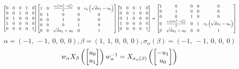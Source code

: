 \documentclass[11pt]{article}
\theoremstyle{definition}
\begin{document}
\[
\scaletoalign{\textwidth}{{\left[\begin{matrix}0 & 0 & 0 & 1 & 0\\0 & 0 & 1 & 0 & 0\\0 & 1 & 0 & 0 & 0\\1 & 0 & 0 & 0 & 0\\0 & 0 & 0 & 0 & 1\end{matrix}\right]} {\left[\begin{matrix}1 & 0 & \frac{c_{0} \left(d u_{1}^{2} - u_{0}^{2}\right)}{2} & 0 & c_{0} \left(\sqrt{d} u_{1} - u_{0}\right)\\0 & 1 & 0 & 0 & 0\\0 & 0 & 1 & 0 & 0\\0 & 0 & 0 & 1 & 0\\0 & 0 & \sqrt{d} u_{1} + u_{0} & 0 & 1\end{matrix}\right]} {\left[\begin{matrix}0 & 0 & 0 & 1 & 0\\0 & 0 & 1 & 0 & 0\\0 & 1 & 0 & 0 & 0\\1 & 0 & 0 & 0 & 0\\0 & 0 & 0 & 0 & 1\end{matrix}\right]} = {\left[\begin{matrix}1 & 0 & 0 & 0 & 0\\0 & 1 & 0 & 0 & 0\\0 & 0 & 1 & 0 & 0\\0 & \frac{c_{0} \left(d u_{1}^{2} - u_{0}^{2}\right)}{2} & 0 & 1 & c_{0} \left(\sqrt{d} u_{1} - u_{0}\right)\\0 & \sqrt{d} u_{1} + u_{0} & 0 & 0 & 1\end{matrix}\right]}}
\]
\[
\alpha = \left( -1, \  -1, \  0, \  0, \  0\right), \beta = \left( 1, \  1, \  0, \  0, \  0\right), \sigma_{\alpha}(\beta) = \left( -1, \  -1, \  0, \  0, \  0\right)
\]
\[
\scaletoalign{\textwidth}{w_{\alpha} X_{\beta}\left(\left[\begin{matrix}u_{0}\\u_{1}\end{matrix}\right]\right) w_{\alpha}^{-1} = X_{\sigma_{\alpha}\left(\beta\right)}\left(\left[\begin{matrix}- u_{1}\\u_{0}\end{matrix}\right]\right)}
\]
\end{document}

